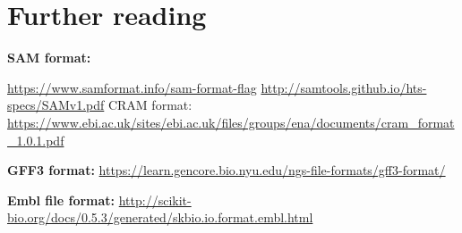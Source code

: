\documentclass[
]{article}
\begin{document}
\section{Further reading}\label{further-reading}

\textbf{SAM format:}

\url{https://www.samformat.info/sam-format-flag}
\url{http://samtools.github.io/hts-specs/SAMv1.pdf} CRAM format:
\url{https://www.ebi.ac.uk/sites/ebi.ac.uk/files/groups/ena/documents/cram_format_1.0.1.pdf}

\textbf{GFF3 format:}
\url{https://learn.gencore.bio.nyu.edu/ngs-file-formats/gff3-format/}

\textbf{Embl file format:}
\url{http://scikit-bio.org/docs/0.5.3/generated/skbio.io.format.embl.html}
\end{document}
